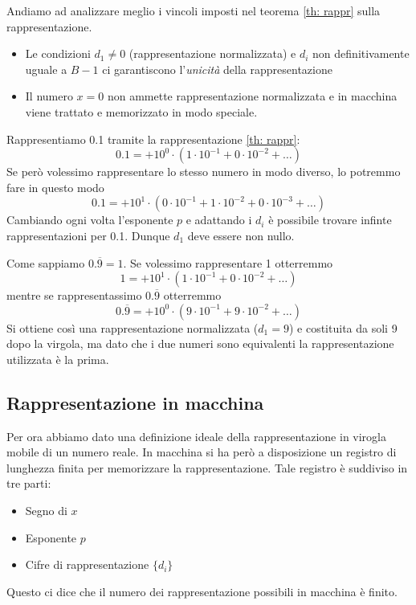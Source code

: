 Andiamo ad analizzare meglio i vincoli imposti nel teorema \ref{th: rappr} sulla rappresentazione.
\begin{itemize}
	\item Le condizioni $d_1 \neq 0$ (rappresentazione normalizzata) e $d_i$ non definitivamente uguale a
	      $B - 1$ ci garantiscono l'\emph{unicità} della rappresentazione
	\item Il numero $x = 0$ non ammette rappresentazione normalizzata e in macchina viene trattato e
	      memorizzato in modo speciale.
\end{itemize}

\begin{example}
	Rappresentiamo 0.1 tramite la rappresentazione \ref{th: rappr}:
	\[ 0.1 = + 10^0 \cdot (1 \cdot 10^{-1} + 0 \cdot 10^{-2} + \dots) \]
	Se però volessimo rappresentare lo stesso numero in modo diverso, lo potremmo fare in questo modo
	\[ 0.1 = + 10^1 \cdot (0 \cdot 10^{-1} + 1 \cdot 10^{-2} + 0 \cdot 10^{-3} + \dots) \]
	Cambiando ogni volta l'esponente $p$ e adattando i $d_i$ è possibile trovare infinte rappresentazioni
	per 0.1. Dunque $d_1$ deve essere non nullo.
\end{example}

\begin{example}
	Come sappiamo $0.\overline{9} = 1$. Se volessimo rappresentare 1 otterremmo
	\[ 1 = + 10^1 \cdot (1 \cdot 10^{-1} + 0 \cdot 10^{-2} + \dots) \]
	mentre se rappresentassimo $0.\overline{9}$ otterremmo
	\[ 0.\overline{9} = + 10^0 \cdot (9 \cdot 10^{-1} + 9 \cdot 10^{-2} + \dots) \]
	Si ottiene così una rappresentazione normalizzata ($d_1 = 9$) e costituita da soli 9 dopo la virgola,
	ma dato che i due numeri sono equivalenti la rappresentazione utilizzata è la prima.
\end{example}

\subsection{Rappresentazione in macchina}
Per ora abbiamo dato una definizione ideale della rappresentazione in virogla mobile di un numero reale.
In macchina si ha però a disposizione un registro di lunghezza finita per memorizzare la rappresentazione.
Tale registro è suddiviso in tre parti:
\begin{itemize}
	\item Segno di $x$
	\item Esponente $p$
	\item Cifre di rappresentazione $\{ d_i \}$
\end{itemize}
Questo ci dice che il numero dei rappresentazione possibili in macchina è finito.

